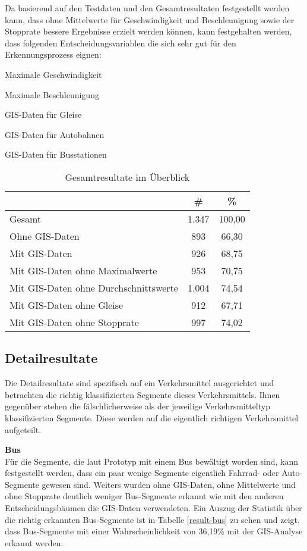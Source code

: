 Da basierend auf den Testdaten und den Gesamtresultaten festgestellt werden kann, dass ohne Mittelwerte für Geschwindigkeit und Beschleunigung sowie der Stopprate bessere Ergebnisse erzielt werden können, kann festgehalten werden, dass folgenden Entscheidungsvariablen die sich sehr gut für den Erkennungsprozess eignen:

\begin{pitemize}
\item Maximale Geschwindigkeit
\item Maximale Beschleunigung
\item GIS-Daten für Gleise
\item GIS-Daten für Autobahnen
\item GIS-Daten für Busstationen
\end{pitemize}

\begin{table}[h]
\centering
\begin{tabular}{|l|c|c|}
\hline
 & \# & \% \\ \hline
Gesamt & 1.347 & 100,00 \\ \hline
Ohne GIS-Daten & 893 & 66,30 \\ \hline
Mit GIS-Daten & 926 & 68,75 \\ \hline
Mit GIS-Daten ohne Maximalwerte & 953 & 70,75 \\ \hline
Mit GIS-Daten ohne Durchschnittswerte & 1.004 & 74,54 \\ \hline
Mit GIS-Daten ohne Gleise & 912 & 67,71 \\ \hline
Mit GIS-Daten ohne Stopprate & 997 & 74,02 \\ \hline
\end{tabular}
\caption{Gesamtresultate im Überblick}
\label{total-results}
\end{table}

\subsection{Detailresultate}
Die Detailresultate sind spezifisch auf ein Verkehrsmittel ausgerichtet und betrachten die richtig klassifizierten Segmente dieses Verkehrsmittels. Ihnen gegenüber stehen die fälschlicherweise als der jeweilige Verkehrsmitteltyp klassifizierten Segmente. Diese werden auf die eigentlich richtigen Verkehrsmittel aufgeteilt.

\textbf{Bus} \\
Für die Segmente, die laut Prototyp mit einem Bus bewältigt worden sind, kann festgestellt werden, dass ein paar wenige Segmente eigentlich Fahrrad- oder Auto-Segmente gewesen sind. Weiters wurden ohne GIS-Daten, ohne Mittelwerte und ohne Stopprate deutlich weniger Bus-Segmente erkannt wie mit den anderen Entscheidungsbäumen die GIS-Daten verwendeten. Ein Auszug der Statistik über die richtig erkannten Bus-Segmente ist in Tabelle \ref{result-bus} zu sehen und zeigt, dass Bus-Segmente mit einer Wahrscheinlichkeit von 36,19\% mit der GIS-Analyse erkannt werden.

